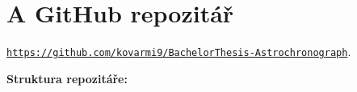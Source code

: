 
\appendix
\chapter*{A GitHub repozitář}
\href{https://github.com/kovarmi9/BachelorThesis-Astrochronograph}{\texttt{https://github.com/kovarmi9/BachelorThesis-Astrochronograph}}.
\begin{center}
\end{center}
\textbf{Struktura repozitáře:}
